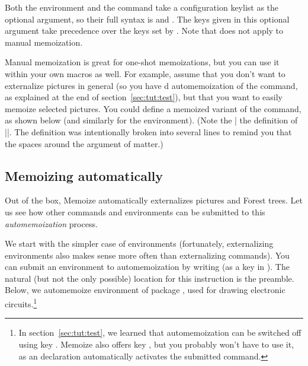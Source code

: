 \documentclass[a4paper,11pt]{article}
\begin{document}
Both the  environment and the  command take a
configuration keylist as the optional argument, so their full syntax is
 and
.  The keys given in
this optional argument take precedence over the keys set by .
Note that  does not apply to manual memoization.

Manual memoization is great for one-shot memoizations, but you can use it
within your own macros as well.  For example, assume that you don't want to
externalize \TikZ pictures in general (so you have d
automemoization of the  command, as explained at the end of
section~\ref{sec:tut:test}), but that you want to easily memoize selected
pictures.  You could define a memoized variant of the  command, as shown
below (and similarly for the environment).  (Note the |%
the definition of |\mmztikz|.  The definition was intentionally broken into
several lines to remind you that the spaces around the argument of 
matter.)


\clearpage
\subsection{Memoizing automatically}
\label{sec:tut:automemoization}

Out of the box, Memoize automatically externalizes \TikZ pictures and Forest
trees.  Let us see how other commands and environments can be submitted to this
\emph{automemoization} process.

We start with the simpler case of environments (fortunately, externalizing
environments also makes sense more often than externalizing commands).  You can
submit an environment to automemoization by writing
 (as
a key in ).  The natural (but not the only possible) location
for this instruction is the preamble.  Below, we automemoize environment
 of package , used for drawing electronic
circuits.\footnote{In section~\ref{sec:tut:test}, we learned that
  automemoization can be switched off using key .  Memoize
  also offers key , but you probably won't have to use it, as
  an  declaration automatically activates the submitted command.}
\end{document}
